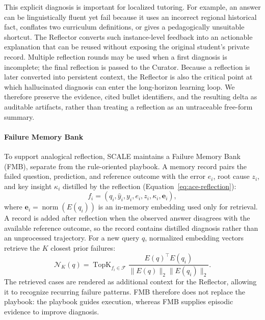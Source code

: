 \documentclass[10pt,conference]{IEEEtran}
\begin{document}
This explicit diagnosis is important for localized tutoring. For example, 
an answer can be linguistically fluent yet fail because it uses an 
incorrect regional historical fact, conflates two curriculum definitions, 
or gives a pedagogically unsuitable shortcut. The Reflector converts such 
instance-level feedback into an actionable explanation that can be reused 
without exposing the original student's private record. Multiple 
reflection rounds may be used when a first diagnosis is incomplete; the 
final reflection is passed to the Curator. Because a reflection is later 
converted into persistent context, the Reflector is also the critical 
point at which hallucinated diagnosis can enter the long-horizon learning 
loop. We therefore preserve the evidence, cited bullet identifiers, and 
the resulting delta as auditable artifacts, rather than treating a 
reflection as an untraceable free-form summary.

\paragraph{Failure Memory Bank}
To support analogical reflection, SCALE maintains a Failure Memory Bank
(FMB), separate from the rule-oriented playbook. A memory record pairs the
failed question, prediction, and reference outcome with the error $e_i$,
root cause $z_i$, and key insight $\kappa_i$ distilled by the reflection
(Equation~\eqref{eq:ace-reflection}):
\begin{equation}
    f_i=(q_i,\hat y_i,y_i,e_i,z_i,\kappa_i,\mathbf{e}_i),
    \label{eq:ace-fmb-schema}
\end{equation}
where $\mathbf{e}_i=\operatorname{norm}(E(q_i))$ is an in-memory
embedding used only for retrieval. A record is added after reflection 
when the observed answer disagrees with the available reference outcome,
so the record contains distilled diagnosis rather than an unprocessed 
trajectory. For a new query $q$, normalized embedding vectors retrieve 
the $K$ closest prior failures:
\begin{equation}
    \mathcal{N}_K(q)=\operatorname{TopK}_{f_i\in\mathcal{F}}
    \frac{E(q)^\top E(q_i)}{\|E(q)\|_2\|E(q_i)\|_2}.
    \label{eq:ace-fmb-retrieval}
\end{equation}
The retrieved cases are rendered as additional context for the Reflector, 
allowing it to recognize recurring failure patterns. FMB therefore does 
not replace the playbook: the playbook guides execution, whereas FMB 
supplies episodic evidence to improve diagnosis.
\end{document}
